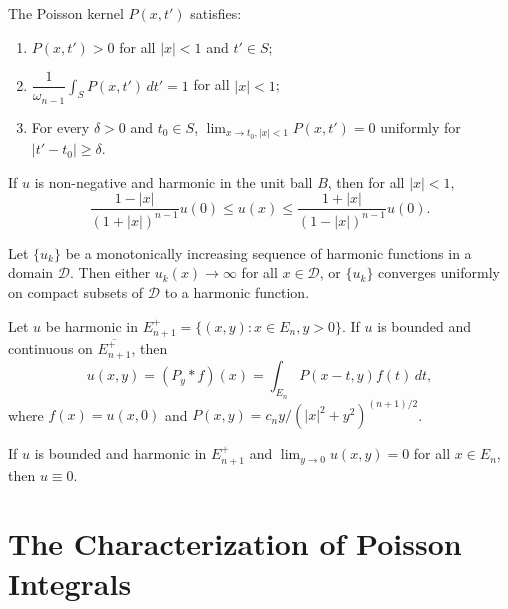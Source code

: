 \begin{theorem}\label{thm:c2-1-10}
The Poisson kernel $P(x, t')$ satisfies:
\begin{enumerate}
\item[(i)] $P(x, t') > 0$ for all $|x| < 1$ and $t' \in S$;
\item[(ii)] $\dfrac{1}{\omega_{n-1}} \displaystyle\int_S P(x, t')\,dt' = 1$ for all $|x| < 1$;
\item[(iii)] For every $\delta > 0$ and $t_0 \in S$, $\lim_{x \to t_0, |x|<1} P(x, t') = 0$ uniformly for $|t' - t_0| \geq \delta$.
\end{enumerate}
\end{theorem}

\begin{corollary}\label{cor:c2-1-11}
If $u$ is non-negative and harmonic in the unit ball $B$, then for all $|x| < 1$,
\[
\frac{1 - |x|}{(1 + |x|)^{n-1}} u(0) \leq u(x) \leq \frac{1 + |x|}{(1 - |x|)^{n-1}} u(0).
\]
\end{corollary}

\begin{theorem}\label{thm:c2-1-12}
Let $\{u_k\}$ be a monotonically increasing sequence of harmonic functions in a domain $\mathcal{D}$. Then either $u_k(x) \to \infty$ for all $x \in \mathcal{D}$, or $\{u_k\}$ converges uniformly on compact subsets of $\mathcal{D}$ to a harmonic function.
\end{theorem}

\begin{theorem}\label{thm:c2-1-13}
Let $u$ be harmonic in $E_{n+1}^+ = \{(x, y) : x \in E_n, y > 0\}$. If $u$ is bounded and continuous on $\overline{E_{n+1}^+}$, then
\begin{equation}\label{eq:c2-1-14}
u(x, y) = (P_y * f)(x) = \int_{E_n} P(x - t, y) f(t)\,dt,
\end{equation}
where $f(x) = u(x, 0)$ and $P(x, y) = c_n y / (|x|^2 + y^2)^{(n+1)/2}$.
\end{theorem}

\begin{corollary}\label{cor:c2-1-15}
If $u$ is bounded and harmonic in $E_{n+1}^+$ and $\lim_{y \to 0} u(x, y) = 0$ for all $x \in E_n$, then $u \equiv 0$.
\end{corollary}

\section{The Characterization of Poisson Integrals}

